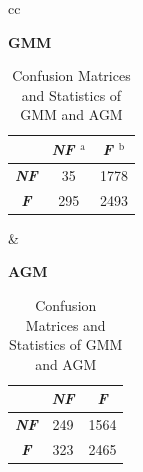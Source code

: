 \documentclass[conference]{IEEEtran}
\begin{document}
\begin{table}[b]
\caption{Confusion Matrices and Statistics of GMM and AGM}
\begin{center}

\begin{minipage}{0.75\textwidth}
\begin{flushleft}
\begin{tabular}{cc}

\begin{minipage}{.3\textwidth} 
\begin{center}
\textbf{GMM} \\
\begin{tabular}{|c|c|c|}
\hline
 & \multicolumn{1}{|p{.7cm}|}{\centering \textbf{\textit{NF $^{\mathrm{a}}$}}} & \multicolumn{1}{|p{.7cm}|}{\centering \textbf{\textit{F $^{\mathrm{b}}$}}}\\
\hline
\multicolumn{1}{|p{.7cm}|}{\centering \textbf{\textit{NF}}} & 35 & 1778\\
\multicolumn{1}{|p{.7cm}|}{\centering \textbf{\textit{F}}} & 295 & 2493\\
\hline
\end{tabular}
\end{center}
\end{minipage} &

\begin{minipage}{.3\textwidth}    
\begin{center}
\textbf{AGM} \\
\begin{tabular}{|c|c|c|}
\hline
 & \multicolumn{1}{|p{.7cm}|}{\centering \textbf{\textit{NF}}} & \multicolumn{1}{|p{.7cm}|}{\centering \textbf{\textit{F}}}\\
\hline
\multicolumn{1}{|p{.7cm}|}{\centering \textbf{\textit{NF}}} & 249 & 1564\\
\multicolumn{1}{|p{.7cm}|}{\centering \textbf{\textit{F}}} & 323 & 2465\\
\hline
\end{tabular}
\end{center}
\end{minipage}  

\end{tabular}
\end{flushleft}
\end{minipage}
\end{center}


\end{table}
\end{document}
